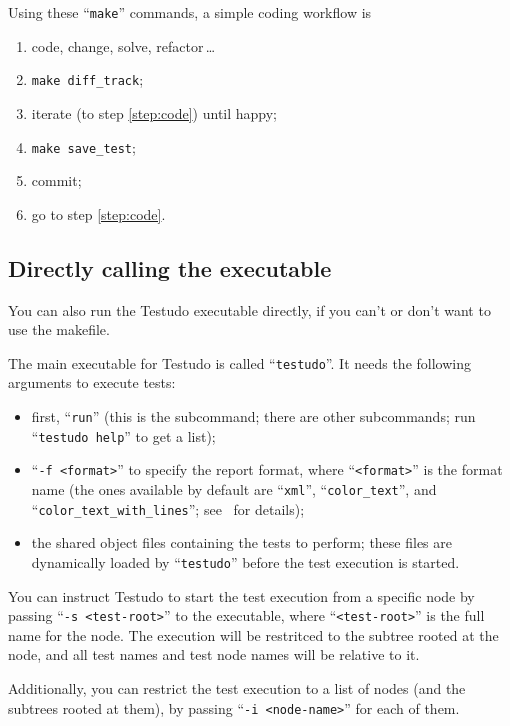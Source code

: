 \documentclass[twoside, a4paper, article]{memoir}
\newcommand*\ellipsis{\,\ldots}
\begin{document}
Using these ``\texttt{make}'' commands, a simple coding workflow is
\begin{enumerate}
\item\label{step:code} code, change, solve, refactor\ellipsis{}
\item \texttt{make diff\_track};
\item iterate (to step \ref{step:code}) until happy;
\item \texttt{make save\_test};
\item commit;
\item go to step \ref{step:code}.
\end{enumerate}


\subsection{Directly calling the executable}
\label{sec:directly-calling-executable}

You can also run the Testudo executable directly, if you can't or don't want to
use the makefile.

The main executable for Testudo is called ``\texttt{testudo}''.  It needs the
following arguments to execute tests:
\begin{itemize}
\item first, ``\texttt{run}'' (this is the subcommand; there are other
  subcommands; run ``\texttt{testudo help}'' to get a list);
\item ``\texttt{-f <format>}'' to specify the report format, where
  ``\texttt{<format>}'' is the format name (the ones available by default are
  ``\texttt{xml}'', ``\texttt{color\_text}'', and
  ``\texttt{color\_text\_with\_lines}''; see~ for
  details);
\item the shared object files containing the tests to perform; these files are
  dynamically loaded by ``\texttt{testudo}'' before the test execution is
  started.
\end{itemize}

You can instruct Testudo to start the test execution from a specific node by
passing ``\texttt{-s <test-root>}'' to the executable, where
``\texttt{<test-root>}'' is the full name for the node.  The execution will be
restritced to the subtree rooted at the node, and all test names and test node
names will be relative to it.

Additionally, you can restrict the test execution to a list of nodes (and the
subtrees rooted at them), by passing ``\texttt{-i <node-name>}'' for each of
them.
\end{document}
